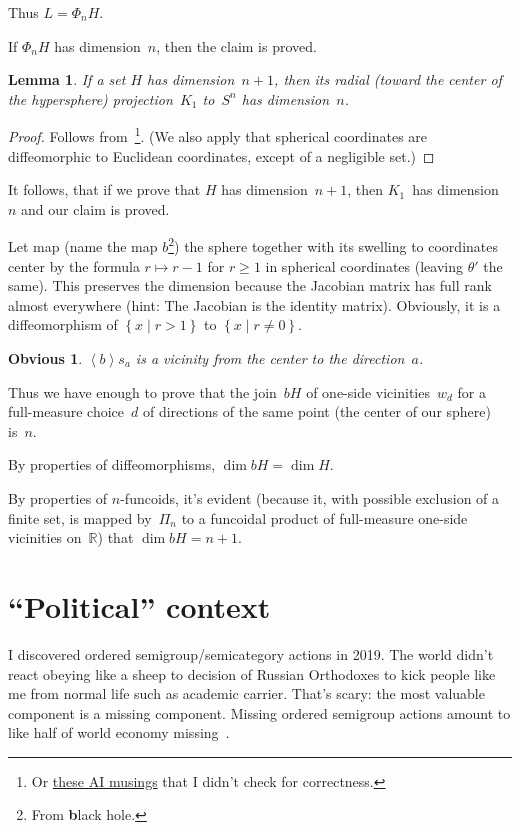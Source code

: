 \documentclass[oneside,draft]{amsart}
\newcommand{\setcond}[2]{\left\{#1\mid#2\right\}}
\newcommand{\supfun}[1]{\left\langle#1\right\rangle}
\newtheorem{lem}{Lemma}
\newtheorem{obvious}{Obvious}
\begin{document}
Thus $L = \Phi_n H$.

If $\Phi_n H$ has dimension~$n$, then the claim is proved.

\begin{lem}
If a set $H$ has dimension~$n+1$, then its radial (toward the center of the hypersphere) projection~$K_1$ to~$S^n$ has dimension~$n$.
\end{lem}

\begin{proof}
Follows from~\cite{189275}\footnote{Or \href{https://grok.com/share/bGVnYWN5_2e0aef8b-4309-420f-815c-a09d76ae97c1}{these AI musings}
that I didn't check for correctness.}.
(We also apply that spherical coordinates are diffeomorphic to Euclidean coordinates, except of a negligible set.)
\end{proof}

It follows, that if we prove that $H$ has dimension~$n+1$, then $K_1$~has dimension~$n$ and our claim is proved.

Let map (name the map $b$\footnote{From \textbf{b}lack hole.}) the sphere together with its swelling to coordinates center by the formula $r\mapsto r-1$ for $r\geq 1$ in spherical coordinates (leaving $\theta'$ the same).
This preserves the dimension because the Jacobian matrix has full rank almost everywhere (hint: The Jacobian is the identity matrix).
Obviously, it is a diffeomorphism of $\setcond{x}{r>1}$ to $\setcond{x}{r\ne 0}$.

\begin{obvious}
$\supfun{b}s_a$ is a vicinity from the center to the direction~$a$.
\end{obvious}

Thus we have enough to prove that the join~$bH$ of one-si\-de vicinities~$w_d$ for a full-me\-a\-su\-re choice~$d$ of directions of the same point (the center of our sphere) is~$n$.

By properties of diffeomorphisms, $\dim bH = \dim H$.

By properties of $n$-fun\-co\-ids, it's evident (because it, with possible exclusion of a finite set, is mapped by~$\Pi_n$ to a funcoidal product of full-measure one-si\-de vicinities on~$\mathbb{R}$) that $\dim bH=n+1$. 

\section{``Political'' context}

I discovered ordered semigroup/semicategory actions in 2019. The world didn't react obeying like a sheep to decision of Russian Orthodoxes to kick people like me from normal life such as academic carrier. That's scary: the most valuable component is a missing component. Missing ordered semigroup actions amount to like half of world economy missing~\cite{osa-important}.
\end{document}
